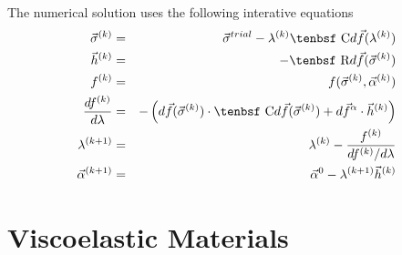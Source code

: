 \documentclass[11pt]{article}
\def\C{\hbox{\tenbsf C}}
\def\df{d \vec{f}}
\def\dfa{d \vec{f}^\alpha}
\def\R{\hbox{\tenbsf R}}
\def\s#1{\sigma_{#1}}
\begin{document}
The numerical solution uses the following interative equations
\begin{eqnarray}
       \vec\sigma^{(k)} & = & \vec\s{}^{trial} - \lambda^{(k)}\C\df(\lambda^{(k)}) \\
        \vec h^{(k)} & = & -\R\df(\vec\sigma^{(k)}) \\
        f^{(k)} & = &  f( \vec\sigma^{(k)},\vec\alpha^{(k)})  \\
        {df^{(k)}\over d\lambda} & = & -\left( \df(\vec\sigma^{(k)})\cdot \C\df(\vec\sigma^{(k)})  + \dfa \cdot \vec h^{(k)}\right) \\
        \lambda^{(k+1)} & = & \lambda^{(k)} - {f^{(k)} \over {df^{(k)}/ d\lambda} } \\
        \vec\alpha^{(k+1)} & = & \vec\alpha^{0} -  \lambda^{(k+1)} \vec h^{(k)}
\end{eqnarray}

\section{Viscoelastic Materials}
\end{document}
